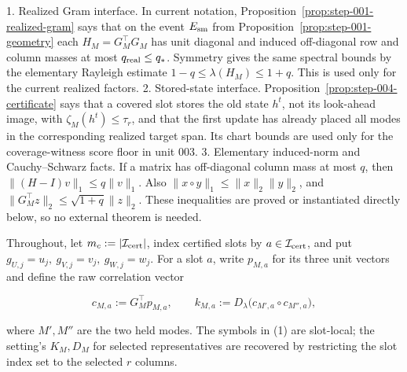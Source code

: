 1. Realized Gram interface. In current notation,
   Proposition~\ref{prop:step-001-realized-gram} says that on the event $E_{\rm sm}$ from Proposition~\ref{prop:step-001-geometry} each
   $H_M=G_M^\top G_M$ has unit diagonal and induced off-diagonal row and
   column masses at most $q_{\rm real}\le q_*$. Symmetry gives the same
   spectral bounds by the elementary Rayleigh estimate
   $1-q\le\lambda(H_M)\le1+q$. This is used only for the current realized
   factors.
2. Stored-state interface.
   Proposition~\ref{prop:step-004-certificate} says that a covered slot stores
   the old state $h^t$, not its look-ahead image, with
   $\zeta_M(h^t)\le\tau_r$, and that the first update has already placed all
   modes in the corresponding realized target span.  Its chart bounds are
   used only for the coverage-witness score floor in unit 003.
3. Elementary induced-norm and Cauchy--Schwarz facts.  If a matrix has
   off-diagonal column mass at most $q$, then
   $\|(H-I)v\|_1\le q\|v\|_1$. Also
   $\|x\circ y\|_1\le\|x\|_2\|y\|_2$, and
   $\|G_M^\top z\|_2\le\sqrt{1+q}\|z\|_2$. These inequalities are
   proved or instantiated directly below, so no external theorem is needed.

Throughout, let $m_c:=|\mathcal I_{\rm cert}|$, index certified slots by
$a\in\mathcal I_{\rm cert}$, and put
$g_{U,j}=u_j,\ g_{V,j}=v_j,\ g_{W,j}=w_j$.  For a slot $a$, write
$p_{M,a}$ for its three unit vectors and define the raw correlation vector

\[
c_{M,a}:=G_M^\top p_{M,a},\qquad
k_{M,a}:=D_\lambda\bigl(c_{M',a}\circ c_{M'',a}\bigr),
\tag{1}
\]

where $M',M''$ are the two held modes.  The symbols in (1) are slot-local;
the setting's $K_M,D_M$ for selected representatives are recovered by
restricting the slot index set to the selected $r$ columns.



